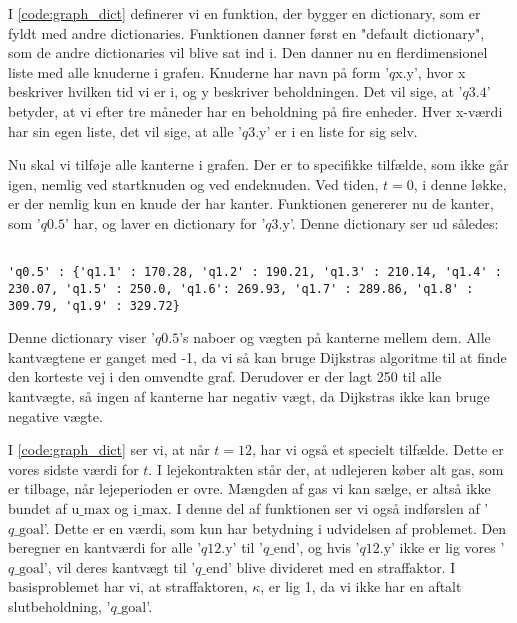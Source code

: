 I \autoref{code:graph_dict} definerer vi en funktion, der bygger en dictionary, som er fyldt med andre dictionaries. Funktionen danner først en "default dictionary", som de andre dictionaries vil blive sat ind i.
Den danner nu en flerdimensionel liste med alle knuderne i grafen. Knuderne har navn på form '$q\textrm{x.y}$', hvor x beskriver hvilken tid vi er i, og y beskriver beholdningen. Det vil sige, at '$q3.4$' betyder, at vi efter tre måneder har en beholdning på fire enheder. Hver x-værdi har sin egen liste, det vil sige, at alle '$q\textrm{3.y}$' er i en liste for sig selv.

Nu skal vi tilføje alle kanterne i grafen. Der er to specifikke tilfælde, som ikke går igen, nemlig ved startknuden og ved endeknuden. Ved tiden, $t=0$, i denne løkke, er der nemlig kun en knude der har kanter. Funktionen genererer nu de kanter, som '$q\textrm{0.5}$' har, og laver en dictionary for '$q\textrm{3.y}$'. 
Denne dictionary ser ud således:

\begin{lstlisting}[label=code:q05, caption=Dictionary for $q \textrm{0.5}$.]

'q0.5' : {'q1.1' : 170.28, 'q1.2' : 190.21, 'q1.3' : 210.14, 'q1.4' : 230.07, 'q1.5' : 250.0, 'q1.6': 269.93, 'q1.7' : 289.86, 'q1.8' : 309.79, 'q1.9' : 329.72}
\end{lstlisting}
Denne dictionary viser '$q0.5$'s naboer og vægten på kanterne mellem dem. Alle kantvægtene er ganget med -1, da vi så kan bruge Dijkstras algoritme til at finde den korteste vej i den omvendte graf. Derudover er der lagt 250 til alle kantvægte, så ingen af kanterne har negativ vægt, da Dijkstras ikke kan bruge negative vægte. 

I \autoref{code:graph_dict} ser vi, at når $t=12$, har vi også et specielt tilfælde. Dette er vores sidste værdi for $t$. I lejekontrakten står der, at udlejeren køber alt gas, som er tilbage, når lejeperioden er ovre. Mængden af gas vi kan sælge, er altså ikke bundet af $\textrm{u\_max}$ og $\textrm{i\_max}$. I denne del af funktionen ser vi også indførslen af '$q\textrm{\_goal}$'. Dette er en værdi, som kun har betydning i udvidelsen af problemet. Den beregner  en kantværdi for alle '$q\textrm{12.y}$' til '$q\textrm{\_end}$', og hvis '$q\textrm{12.y}$' ikke er lig vores '$q\textrm{\_goal}$', vil deres kantvægt til '$q\textrm{\_end}$' blive divideret med en straffaktor. I basisproblemet har vi, at straffaktoren, $\kappa$, er lig 1, da vi ikke har en aftalt slutbeholdning, '$q\textrm{\_goal}$'.

